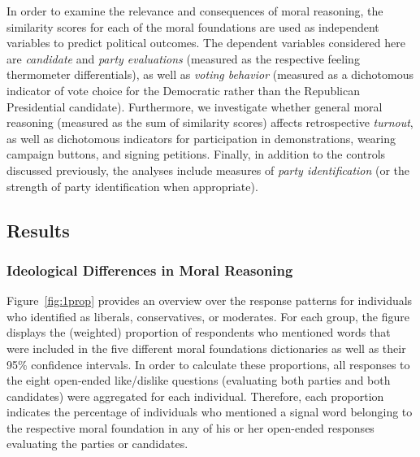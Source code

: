 \documentclass[12pt]{article}
\begin{document}
In order to examine the relevance and consequences of moral reasoning, the similarity scores for each of the moral foundations are used as independent variables to predict political outcomes. The dependent variables considered here are \textit{candidate} and \textit{party evaluations} (measured as the respective feeling thermometer differentials), as well as \textit{voting behavior} (measured as a dichotomous indicator of vote choice for the Democratic rather than the Republican Presidential candidate). Furthermore, we investigate whether general moral reasoning (measured as the sum of similarity scores) affects retrospective \textit{turnout}, as well as dichotomous indicators for participation in demonstrations, wearing campaign buttons, and signing petitions. Finally, in addition to the controls discussed previously, the analyses include measures of \textit{party identification} (or the strength of party identification when appropriate).



\subsection{Results}

\subsubsection{Ideological Differences in Moral Reasoning}

Figure~\ref{fig:1prop} provides an overview over the response patterns for individuals who identified as liberals, conservatives, or moderates. For each group, the figure displays the (weighted) proportion of respondents who mentioned words that were included in the five different moral foundations dictionaries as well as their 95\% confidence intervals. In order to calculate these proportions, all responses to the eight open-ended like/dislike questions (evaluating both parties and both candidates) were aggregated for each individual. Therefore, each proportion indicates the percentage of individuals who mentioned a signal word belonging to the respective moral foundation in any of his or her open-ended responses evaluating the parties or candidates.
\end{document}
